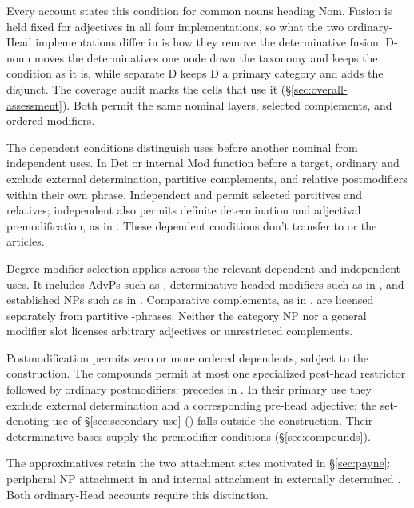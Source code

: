 \documentclass[12pt]{article}
\begin{document}
Every account states this condition for common nouns heading Nom. Fusion is held fixed for adjectives in all four implementations, so what the two ordinary-Head implementations differ in is how they remove the determinative fusion: D-noun moves the determinatives one node down the taxonomy and keeps the condition as it is, while separate D keeps D a primary category and adds the disjunct. The coverage audit marks the cells that use it (§\ref{sec:overall-assessment}). Both permit the same nominal layers, selected complements, and ordered modifiers.

The dependent conditions distinguish uses before another nominal from independent uses. In Det or internal Mod function before a target, ordinary  and  exclude external determination, partitive complements, and relative postmodifiers within their own phrase. Independent  and  permit selected partitives and relatives; independent  also permits definite determination and adjectival premodification, as in . These dependent conditions don't transfer to  or the articles.

Degree-modifier selection applies across the relevant dependent and independent uses. It includes AdvPs such as , determinative-headed modifiers such as  in , and established NPs such as  in . Comparative complements, as in , are licensed separately from partitive -phrases. Neither the category NP nor a general modifier slot licenses arbitrary adjectives or unrestricted complements.

Postmodification permits zero or more ordered dependents, subject to the construction. The compounds permit at most one specialized post-head restrictor followed by ordinary postmodifiers:  precedes  in . In their primary use they exclude external determination and a corresponding pre-head adjective; the set-denoting use of §\ref{sec:secondary-use} () falls outside the construction. Their determinative bases supply the premodifier conditions (§\ref{sec:compounds}).

The approximatives retain the two attachment sites motivated in §\ref{sec:payne}: peripheral NP attachment in  and internal attachment in externally determined . Both ordinary-Head accounts require this distinction.
\end{document}
